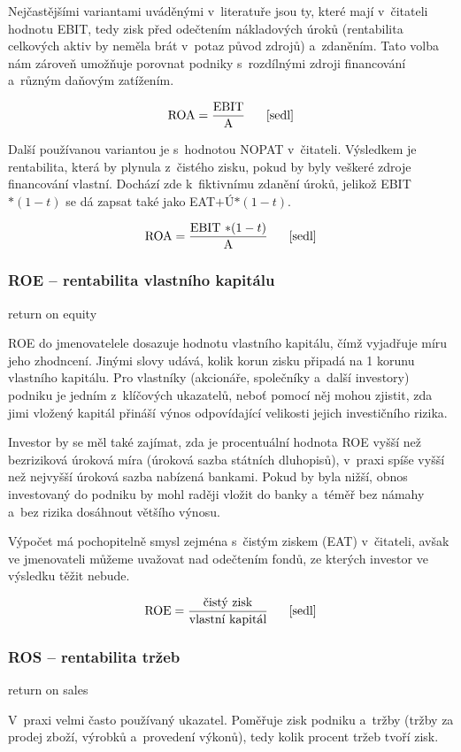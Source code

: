 Nejčastějšími variantami uváděnými v~literatuře jsou ty, které mají v~čitateli hodnotu EBIT, tedy zisk před odečtením nákladových úroků (rentabilita celkových aktiv by neměla brát v~potaz původ zdrojů) a~zdaněním. Tato volba nám zároveň umožňuje porovnat podniky s~rozdílnými zdroji financování a~různým daňovým zatížením.

$$\vz{ROA}{EBIT}{A} \scite{sedl}$$

Další používanou variantou je s~hodnotou NOPAT v~čitateli. Výsledkem je rentabilita, která by plynula z~čistého zisku, pokud by byly veškeré zdroje financování vlastní. Dochází zde k~fiktivnímu zdanění úroků, jelikož EBIT$*(1-t)$ se dá zapsat také jako EAT$+$Ú$*(1-t)$.

$$\vz{ROA}{EBIT $*(1-t)$}{A} \scite{sedl}$$ 


\subsubsection{ROE -- rentabilita vlastního kapitálu}
return on equity

ROE do jmenovatelele dosazuje hodnotu vlastního kapitálu, čímž vyjadřuje míru jeho zhodncení. Jinými slovy udává, kolik korun zisku připadá na 1 korunu vlastního kapitálu. Pro vlastníky (akcionáře, společníky a~další investory) podniku je jedním z~klíčových ukazatelů, neboť pomocí něj mohou zjistit, zda jimi vložený kapitál přináší výnos odpovídající velikosti jejich investičního rizika.\cite{sedl}

Investor by se měl také zajímat, zda je procentuální hodnota ROE vyšší než bezriziková úroková míra (úroková sazba státních dluhopisů), v~praxi spíše vyšší než nejvyšší úroková sazba nabízená bankami. Pokud by byla nižší, obnos investovaný do podniku by mohl raději vložit do banky a~téměř bez námahy a~bez rizika dosáhnout většího výnosu.

Výpočet má pochopitelně smysl zejména s~čistým ziskem (EAT) v~čitateli, avšak ve jmenovateli můžeme uvažovat nad odečtením fondů, ze kterých investor ve výsledku těžit nebude.

$$\vz{ROE}{čistý zisk}{vlastní kapitál} \scite{sedl}$$ 


\subsubsection{ROS -- rentabilita tržeb}
return on sales

V~praxi velmi často používaný ukazatel. Poměřuje zisk podniku a~tržby (tržby za prodej zboží, výrobků a~provedení výkonů), tedy kolik procent tržeb tvoří zisk.

